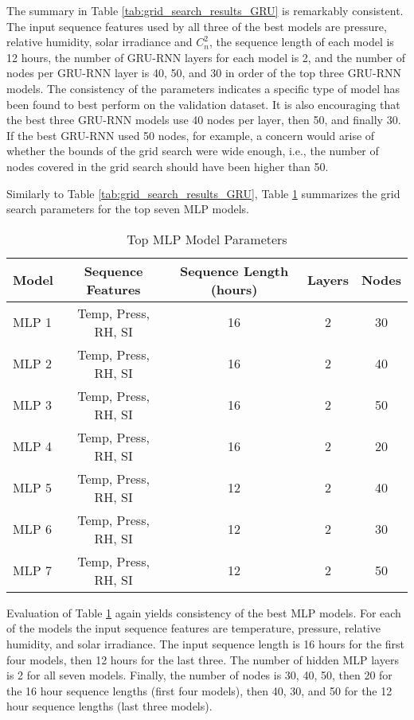 The summary in Table \ref{tab:grid_search_results_GRU} is remarkably consistent. The input sequence features used by all three of the best models are pressure, relative humidity, solar irradiance and $C_{n}^{2}$, the sequence length of each model is 12 hours, the number of \ac{GRU-RNN} layers for each model is 2, and the number of nodes per \ac{GRU-RNN} layer is 40, 50, and 30 in order of the top three \ac{GRU-RNN} models. The consistency of the parameters indicates a specific type of model has been found to best perform on the validation dataset. It is also encouraging that the best three \ac{GRU-RNN} models use 40 nodes per layer, then 50, and finally 30. If the best \ac{GRU-RNN} used 50 nodes, for example, a concern would arise of whether the bounds of the grid search were wide enough, i.e., the number of nodes covered in the grid search should have been higher than 50.

Similarly to Table \ref{tab:grid_search_results_GRU}, Table \ref{tab:grid_search_results_MLP} summarizes the grid search parameters for the top seven \ac{MLP} models.
\begin{table}[h!]
	\begin{center}
		\caption{Top MLP Model Parameters}
		\label{tab:grid_search_results_MLP}
		\begin{tabular}{||l|c|c|c|c||}
			\hline
			Model & Sequence Features & Sequence Length (hours) & Layers & Nodes \\
			\hline
			\hline
			MLP 1 & Temp, Press, RH, SI & 16 & 2 & 30 \\
			\hline
			MLP 2 & Temp, Press, RH, SI & 16 & 2 & 40 \\
			\hline
			MLP 3 & Temp, Press, RH, SI & 16 & 2 & 50 \\
			\hline
			MLP 4 & Temp, Press, RH, SI & 16 & 2 & 20 \\
			\hline
			MLP 5 & Temp, Press, RH, SI & 12 & 2 & 40 \\
			\hline
			MLP 6 & Temp, Press, RH, SI & 12 & 2 & 30 \\
			\hline
			MLP 7 & Temp, Press, RH, SI & 12 & 2 & 50 \\
			\hline
		\end{tabular}
	\end{center}
\end{table}
Evaluation of Table \ref{tab:grid_search_results_MLP} again yields consistency of the best \ac{MLP} models. For each of the models the input sequence features are temperature, pressure, relative humidity, and solar irradiance. The input sequence length is 16 hours for the first four models, then 12 hours for the last three. The number of hidden \ac{MLP} layers is 2 for all seven models. Finally, the number of nodes is 30, 40, 50, then 20 for the 16 hour sequence lengths (first four models), then 40, 30, and 50 for the 12 hour sequence lengths (last three models).

